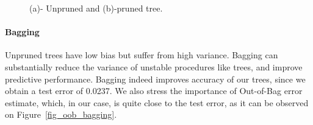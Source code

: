 \begin{figure}[htb]
	\hfill%
	\hfill%
	\hfill\null%
	\caption{(a)- Unpruned and (b)-pruned tree.}
	\label{fig_tree}
\end{figure}
\paragraph{Bagging}
Unpruned trees have low bias but suffer from high variance. Bagging can substantially reduce the variance of unstable procedures like trees, and improve predictive performance. Bagging indeed improves accuracy of our trees, since we obtain a test error of \num{0.0237}. We also stress the importance of Out-of-Bag error estimate, which, in our case, is quite close to the test error, as it can be observed on Figure~\ref{fig_oob_bagging}.
